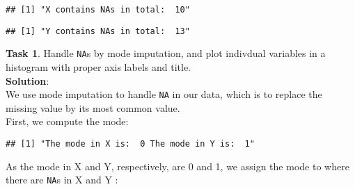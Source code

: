 \documentclass[]{article}
\newenvironment{Shaded}{\begin{snugshade}}{\end{snugshade}}
\newcommand{\KeywordTok}[1]{\textcolor[rgb]{0.13,0.29,0.53}{\textbf{#1}}}
\newcommand{\DecValTok}[1]{\textcolor[rgb]{0.00,0.00,0.81}{#1}}
\newcommand{\StringTok}[1]{\textcolor[rgb]{0.31,0.60,0.02}{#1}}
\newcommand{\OperatorTok}[1]{\textcolor[rgb]{0.81,0.36,0.00}{\textbf{#1}}}
\newcommand{\NormalTok}[1]{#1}
\begin{document}
\begin{verbatim}
## [1] "X contains NAs in total:  10"
\end{verbatim}

\begin{Shaded}
\end{Shaded}

\begin{verbatim}
## [1] "Y contains NAs in total:  13"
\end{verbatim}

\textbf{Task 1}. Handle \texttt{NA}s by mode imputation, and plot
indivdual variables in a histogram with proper axis labels and title.\\
\textbf{Solution}:\\
We use mode imputation to handle \texttt{NA} in our data, which is to
replace the missing value by its most common value.\\
First, we compute the mode:

\begin{Shaded}
\end{Shaded}

\begin{verbatim}
## [1] "The mode in X is:  0 The mode in Y is:  1"
\end{verbatim}

As the mode in X and Y, respectively, are 0 and 1, we assign the mode to
where there are \texttt{NA}s in X and Y :

\begin{Shaded}
\end{Shaded}
\end{document}
